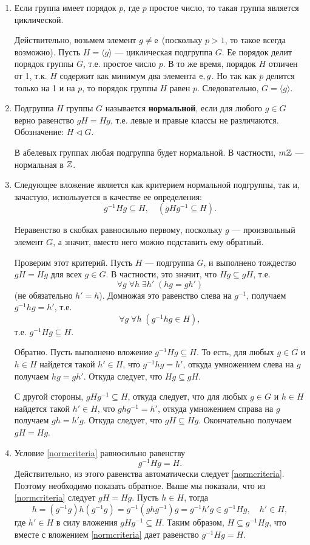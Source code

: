 \begin{enumerate}
\item Если группа имеет порядок $p$, где $p$ простое число, то такая группа является циклической.

Действительно, возьмем элемент $g\ne\mathsf e$ (поскольку $p>1$, то такое всегда возможно). Пусть $H=\langle g\rangle$ --- циклическая подгруппа $G$. Ее порядок делит порядок группы $G$, т.е. простое число $p$. В то же время, порядок $H$ отличен от 1, т.к. $H$ содержит как минимум два элемента $\mathsf e,g$. Но так как $p$ делится только на 1 и на $p$, то порядок группы $H$ равен $p$. Следовательно, $G=\langle g\rangle$.
\item Подгруппа $H$ группы $G$ называется \textbf{нормальной}, если для любого $g\in G$ верно равенство $gH=Hg$, т.е. левые и правые классы не различаются. Обозначение: $H\vartriangleleft G$.

В абелевых группах любая подгруппа будет нормальной. В частности, $m\mathbb Z$ --- нормальная в $\mathbb Z$.

\item Следующее вложение является как критерием нормальной подгруппы, так и, зачастую, используется в качестве ее определения:
\begin{equation}\label{normcriteria}
g^{-1}Hg\subseteq H,\quad (gHg^{-1}\subseteq H).
\end{equation}

Неравенство в скобках равносильно первому, поскольку $g$ --- произвольный элемент $G$, а значит, вместо него можно подставить ему обратный.

Проверим этот критерий. Пусть $H$ --- подгруппа $G$, и выполнено тождество $gH=Hg$ для всех $g\in G$. В частности, это значит, что $Hg\subseteq gH$, т.е.
$$
\forall g\;\forall h\;\exists h'\;(hg=gh')
$$
(не обязательно $h'=h$). Домножая это равенство слева на $g^{-1}$, получаем $g^{-1}hg=h'$, т.е.
$$
\forall g\;\forall h\;(g^{-1}hg\in H),
$$
т.е. $g^{-1}Hg\subseteq H$.

Обратно. Пусть выполнено вложение $g^{-1}Hg\subseteq H$. То есть, для любых $g\in G$ и $h\in H$ найдется такой $h'\in H$, что $g^{-1}hg=h'$, откуда умножением слева на $g$ получаем $hg=gh'$. Откуда следует, что $Hg\subseteq gH$.

С другой стороны, $gHg^{-1}\subseteq H$, откуда следует, что для любых $g\in G$ и $h\in H$ найдется такой $h'\in H$, что $ghg^{-1}=h'$, откуда умножением справа на $g$ получаем $gh=h'g$. Откуда следует, что $gH\subseteq Hg$. Окончательно получаем $gH=Hg$.

\item Условие \eqref{normcriteria} равносильно равенству
$$
g^{-1}Hg=H.
$$
Действительно, из этого равенства автоматически следует \eqref{normcriteria}. Поэтому необходимо показать обратное. Выше мы показали, что из \eqref{normcriteria} следует $gH=Hg$. Пусть $h\in H$, тогда
$$
h=(g^{-1}g)h(g^{-1}g)=g^{-1}(ghg^{-1})g=g^{-1}h'g\in g^{-1}Hg,\quad h'\in H,
$$
где $h'\in H$ в силу вложения $gHg^{-1}\subseteq H$. Таким образом, $H\subseteq g^{-1}Hg$, что вместе с вложением \eqref{normcriteria} дает равенство $g^{-1}Hg=H$.



\end{enumerate}
